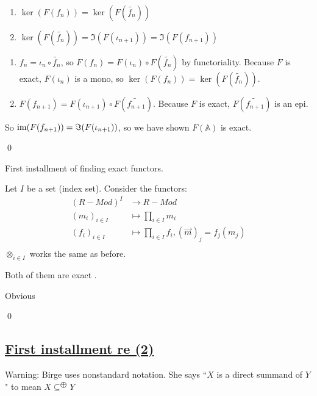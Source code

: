 \documentclass[x11names,reqno,14pt]{extarticle}
\newcommand{\A}{\mathbb{A}}
\begin{document}
\claim
\,

\begin{enumerate}[label=(\alph*)]

\item $\ker(F(f_n)) = \ker(F(\tilde{f_n}))$
\item $\ker(F(\tilde{f_n})) = \Im(F(\iota_{n + 1})) = \Im(F(f_{n + 1}))$

\end{enumerate}

\proof

\begin{enumerate}[label=(\alph*)]

\item $f_n = \iota_n\circ\tilde{f_n}$, so $F(f_n) = F(\iota_n) \circ F(\tilde{f_n})$ by functoriality. Because $F$ is exact, $F(\iota_n)$ is a mono, so $\ker(F(f_n)) = \ker(F(\tilde{f_n}))$. 

\item $F(f_{n + 1}) = F(\iota_{n + 1}) \circ F(\tilde{f_{n + 1}})$. Because $F$ is exact, $F(\tilde{f_{n + 1}})$ is an epi.

\end{enumerate}

So $\operatorname{\mathrm{im}}(F(f_{n + 1})) = \Im(F(\iota_{n + 1}))$, so we have shown $F(\A)$ is exact. 

\qed

First installment of finding exact functors. 

\prop

Let $I$ be a set (index set). Consider the functors:
\begin{align*}
(R-Mod)^I &\to R-Mod \\
(m_i)_{i\in I} & \mapsto \prod_{i\in I}m_i \\
(f_i)_{i\in I} & \mapsto \prod_{i\in I}f_i, (\vec{m})_j = f_j(m_j) \\
\end{align*}
$\otimes_{i\in I}$ works the same as before. 

Both of them are exact .

\proof

Obvious

\qed

\subsection*{\underline{First installment re (2)}}

\rem 

Warning: Birge uses nonstandard notation. She says ``$X$ is a direct summand of $Y$" to mean $X\subseteq^{\bigoplus} Y$
\end{document}
